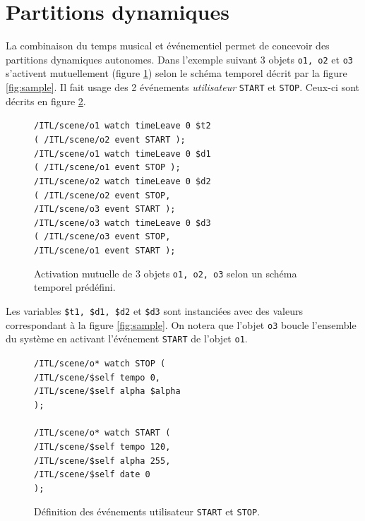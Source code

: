 \documentclass{article}
\newcommand{\OSC}[1]	{{\fontsize{9pt}{9pt} \selectfont\texttt{#1}}}
\newcommand{\tab}{\hspace*{4mm}}
\newcommand{\sample}[1]		{\vspace{-0.2em}\begin{center}\colorbox{mygrey}{\begin{minipage}[t]{0.98\columnwidth} {\small \texttt{#1}}\end{minipage}}\end{center}}
\begin{document}
\section{Partitions dynamiques}

La combinaison du temps musical et événementiel permet de concevoir des partitions dynamiques autonomes. Dans l'exemple suivant 3 objets \OSC{o1, o2} et \OSC{o3} s'activent mutuellement (figure \ref{fig:ex1}) selon le schéma temporel décrit par la figure \ref{fig:sample}. Il fait usage des 2 événements \emph{utilisateur} \OSC{START} et \OSC{STOP}. Ceux-ci sont décrits en figure \ref{fig:ex2}.

\begin{figure}[h]
   \centering
\sample{/ITL/scene/o1 watch timeLeave 0 \$t2 \\
   \tab( /ITL/scene/o2 event START );\\
	/ITL/scene/o1 watch timeLeave 0 \$d1 \\
	\tab( /ITL/scene/o1 event STOP );\\
	/ITL/scene/o2 watch timeLeave 0 \$d2 \\
	\tab( /ITL/scene/o2 event STOP, \\
	\tab \tab/ITL/scene/o3 event START );\\
	/ITL/scene/o3 watch timeLeave 0 \$d3 \\
	\tab( /ITL/scene/o3 event STOP, \\
	\tab \tab/ITL/scene/o1 event START );
}
   \caption{Activation mutuelle de 3 objets \OSC{o1, o2, o3} selon un schéma temporel prédéfini.}
   \label{fig:ex1}
\end{figure}

Les variables \OSC{\$t1, \$d1, \$d2} et \OSC{\$d3} sont instanciées avec des valeurs correspondant à la figure \ref{fig:sample}. On notera que l'objet \OSC{o3} boucle l'ensemble du système en activant l'événement \OSC{START} de l'objet \OSC{o1}.

\begin{figure}[h]
   \centering
\sample{/ITL/scene/o* watch STOP ( \\
   \tab/ITL/scene/\$self tempo 0,\\
   \tab/ITL/scene/\$self alpha \$alpha	\\
);\\
\\
/ITL/scene/o* watch START ( \\
   \tab/ITL/scene/\$self tempo 120,\\
   \tab/ITL/scene/\$self alpha 255,\\
   \tab/ITL/scene/\$self date 0\\
);
}
   \caption{Définition des événements utilisateur \OSC{START} et \OSC{STOP}.}
   \label{fig:ex2}
\end{figure}
\end{document}

